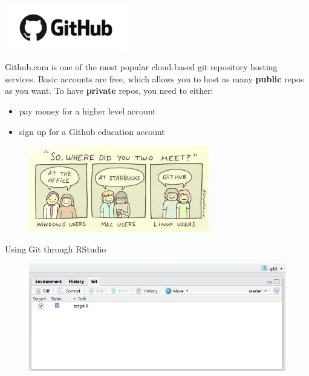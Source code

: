 \documentclass{beamer}
\begin{document}
\begin{frame}{\includegraphics[width=0.4\textwidth]{github}}

  Github.com is one of the most popular cloud-based git repository hosting
  services. Basic accounts are free, which allows you to host as many
  \textbf{public} repos as you want. To have \textbf{private} repos,
  you need to either:
  \begin{itemize}
  \item pay money for a higher level account
  \item sign up for a Github education account 
  \end{itemize}

  \pause

  \begin{figure}
    \centering
    \includegraphics[width=0.7\textwidth]{comic1}
  \end{figure}
  
\end{frame}

\begin{frame}{Using Git through RStudio}

  \begin{figure}
    \centering
    \includegraphics[width=\textwidth]{rstudiogit}
  \end{figure}

\end{frame}
\end{document}
